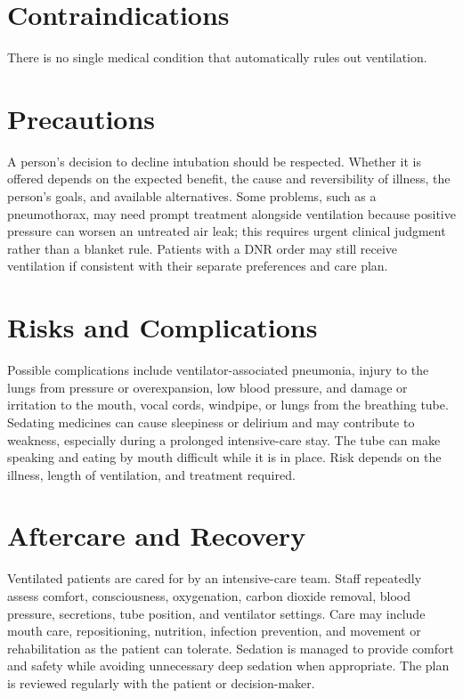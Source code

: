\section*{Contraindications}
There is no single medical condition that automatically rules out ventilation.

\section*{Precautions}
A person's decision to decline intubation should be respected. Whether it is offered depends on the expected benefit, the cause and reversibility of illness, the person's goals, and available alternatives. Some problems, such as a pneumothorax, may need prompt treatment alongside ventilation because positive pressure can worsen an untreated air leak; this requires urgent clinical judgment rather than a blanket rule. Patients with a DNR order may still receive ventilation if consistent with their separate preferences and care plan.

\section*{Risks and Complications}
Possible complications include ventilator-associated pneumonia, injury to the lungs from pressure or overexpansion, low blood pressure, and damage or irritation to the mouth, vocal cords, windpipe, or lungs from the breathing tube. Sedating medicines can cause sleepiness or delirium and may contribute to weakness, especially during a prolonged intensive-care stay. The tube can make speaking and eating by mouth difficult while it is in place. Risk depends on the illness, length of ventilation, and treatment required.

\section*{Aftercare and Recovery}
Ventilated patients are cared for by an intensive-care team. Staff repeatedly assess comfort, consciousness, oxygenation, carbon dioxide removal, blood pressure, secretions, tube position, and ventilator settings. Care may include mouth care, repositioning, nutrition, infection prevention, and movement or rehabilitation as the patient can tolerate. Sedation is managed to provide comfort and safety while avoiding unnecessary deep sedation when appropriate. The plan is reviewed regularly with the patient or decision-maker.

